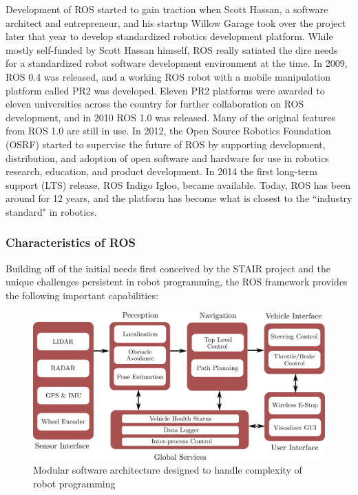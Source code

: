 Development of ROS started to gain traction when Scott Hassan, a software architect and entrepreneur, and his startup  Willow Garage took over the project later that year to develop standardized robotics development platform. While mostly self-funded by Scott Hassan himself, ROS really satiated the dire needs for a standardized robot software development environment at the time. In 2009, ROS 0.4 was released, and a working ROS robot with a mobile manipulation platform called PR2 was developed. Eleven PR2 platforms were awarded to eleven universities across the country for further collaboration on ROS development, and in 2010 ROS 1.0 was released. Many of the original features from ROS 1.0 are still in use. In 2012, the Open Source Robotics Foundation (OSRF) started to supervise the future of ROS by supporting development, distribution, and adoption of open software and hardware for use in robotics research, education, and product development. In 2014 the first long-term support (LTS) release, ROS Indigo Igloo, became available.
Today, ROS has been around for 12 years, and the platform has become what is closest to the ``industry standard" in robotics. 

\subsubsection{Characteristics of ROS}
Building off of the initial needs first conceived by the STAIR project and the unique challenges persistent in robot programming, the ROS framework provides the following important capabilities:
\begin{figure}[t] 
    \centering 
    \includegraphics[width=0.75\linewidth]{tex/figs/ch02_figs/ROS_modular.png}
    \caption{Modular software architecture designed to handle complexity of robot programming}
    \label{modularity} 
\end{figure}

